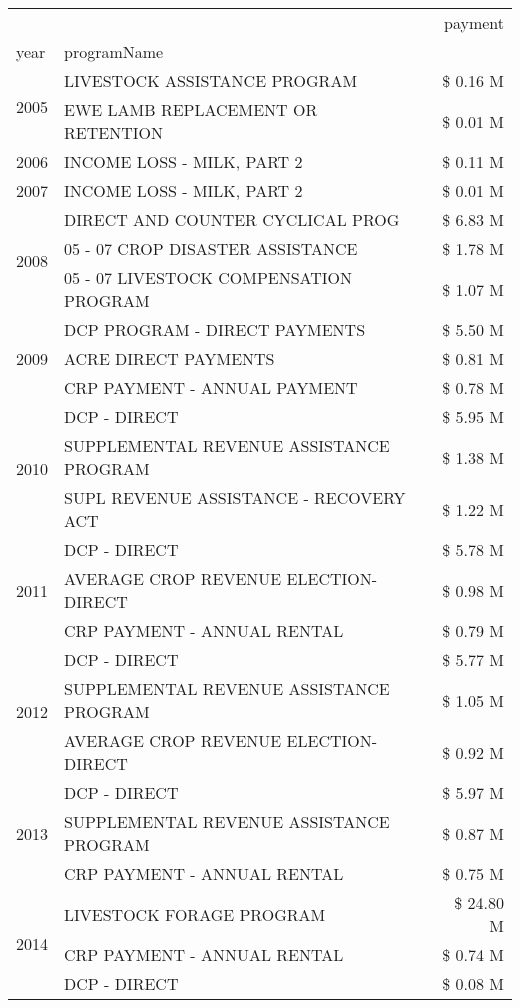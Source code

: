 \begin{tabular}{llr}
\toprule
 &  & payment \\
year & programName &  \\
\midrule
\multirow[t]{2}{*}{2005} & LIVESTOCK ASSISTANCE PROGRAM & \$ 0.16 M \\
 & EWE LAMB REPLACEMENT OR RETENTION & \$ 0.01 M \\
\cline{1-3}
2006 & INCOME LOSS - MILK, PART 2 & \$ 0.11 M \\
\cline{1-3}
2007 & INCOME LOSS - MILK, PART 2 & \$ 0.01 M \\
\cline{1-3}
\multirow[t]{3}{*}{2008} & DIRECT AND COUNTER CYCLICAL PROG & \$ 6.83 M \\
 & 05 - 07 CROP DISASTER ASSISTANCE & \$ 1.78 M \\
 & 05 - 07 LIVESTOCK COMPENSATION PROGRAM & \$ 1.07 M \\
\cline{1-3}
\multirow[t]{3}{*}{2009} & DCP PROGRAM - DIRECT PAYMENTS & \$ 5.50 M \\
 & ACRE DIRECT PAYMENTS & \$ 0.81 M \\
 & CRP PAYMENT - ANNUAL PAYMENT & \$ 0.78 M \\
\cline{1-3}
\multirow[t]{3}{*}{2010} & DCP - DIRECT & \$ 5.95 M \\
 & SUPPLEMENTAL REVENUE ASSISTANCE PROGRAM & \$ 1.38 M \\
 & SUPL REVENUE ASSISTANCE - RECOVERY ACT & \$ 1.22 M \\
\cline{1-3}
\multirow[t]{3}{*}{2011} & DCP - DIRECT & \$ 5.78 M \\
 & AVERAGE CROP REVENUE ELECTION-DIRECT & \$ 0.98 M \\
 & CRP PAYMENT - ANNUAL RENTAL & \$ 0.79 M \\
\cline{1-3}
\multirow[t]{3}{*}{2012} & DCP - DIRECT & \$ 5.77 M \\
 & SUPPLEMENTAL REVENUE ASSISTANCE PROGRAM & \$ 1.05 M \\
 & AVERAGE CROP REVENUE ELECTION-DIRECT & \$ 0.92 M \\
\cline{1-3}
\multirow[t]{3}{*}{2013} & DCP - DIRECT & \$ 5.97 M \\
 & SUPPLEMENTAL REVENUE ASSISTANCE PROGRAM & \$ 0.87 M \\
 & CRP PAYMENT - ANNUAL RENTAL & \$ 0.75 M \\
\cline{1-3}
\multirow[t]{3}{*}{2014} & LIVESTOCK FORAGE PROGRAM & \$ 24.80 M \\
 & CRP PAYMENT - ANNUAL RENTAL & \$ 0.74 M \\
 & DCP - DIRECT & \$ 0.08 M \\

\end{tabular}
